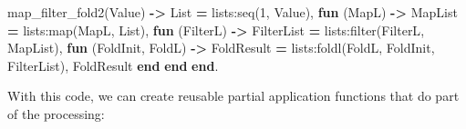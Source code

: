 \documentclass[
]{book}
\newenvironment{Shaded}{\begin{snugshade}}{\end{snugshade}}
\newcommand{\DecValTok}[1]{\textcolor[rgb]{0.00,0.00,0.81}{#1}}
\newcommand{\FunctionTok}[1]{\textcolor[rgb]{0.00,0.00,0.00}{#1}}
\newcommand{\KeywordTok}[1]{\textcolor[rgb]{0.13,0.29,0.53}{\textbf{#1}}}
\newcommand{\OperatorTok}[1]{\textcolor[rgb]{0.81,0.36,0.00}{\textbf{#1}}}
\newcommand{\VariableTok}[1]{\textcolor[rgb]{0.00,0.00,0.00}{#1}}
\begin{document}
\begin{Shaded}
\begin{Highlighting}[]
\FunctionTok{map\_filter\_fold2(}\VariableTok{Value}\FunctionTok{)} \OperatorTok{{-}\textgreater{}}
    \VariableTok{List} \OperatorTok{=} \FunctionTok{lists:seq(}\DecValTok{1}\FunctionTok{,} \VariableTok{Value}\FunctionTok{),}
    \KeywordTok{fun} \FunctionTok{(}\VariableTok{MapL}\FunctionTok{)} \OperatorTok{{-}\textgreater{}} 
        \VariableTok{MapList} \OperatorTok{=} \FunctionTok{lists:map(}\VariableTok{MapL}\FunctionTok{,} \VariableTok{List}\FunctionTok{),}
        \KeywordTok{fun} \FunctionTok{(}\VariableTok{FilterL}\FunctionTok{)} \OperatorTok{{-}\textgreater{}}
            \VariableTok{FilterList} \OperatorTok{=} \FunctionTok{lists:filter(}\VariableTok{FilterL}\FunctionTok{,} \VariableTok{MapList}\FunctionTok{),}
            \KeywordTok{fun} \FunctionTok{(}\VariableTok{FoldInit}\FunctionTok{,} \VariableTok{FoldL}\FunctionTok{)} \OperatorTok{{-}\textgreater{}}
                \VariableTok{FoldResult} \OperatorTok{=} \FunctionTok{lists:foldl(}\VariableTok{FoldL}\FunctionTok{,} \VariableTok{FoldInit}\FunctionTok{,} \VariableTok{FilterList}\FunctionTok{),}
                \VariableTok{FoldResult}
            \KeywordTok{end}
        \KeywordTok{end}
    \KeywordTok{end}\FunctionTok{.}
\end{Highlighting}
\end{Shaded}

With this code, we can create reusable partial application functions that do part of the processing:
\end{document}
